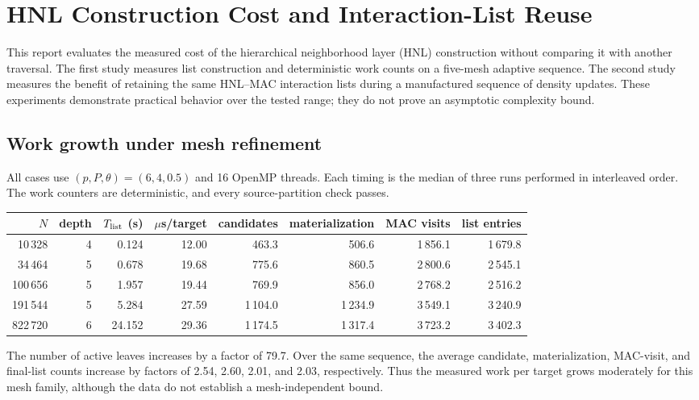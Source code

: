 \documentclass[10pt]{article}
\begin{document}
\section*{HNL Construction Cost and Interaction-List Reuse}

This report evaluates the measured cost of the hierarchical neighborhood
layer (HNL) construction without comparing it with another traversal.  The
first study measures list construction and deterministic work counts on a
five-mesh adaptive sequence.  The second study measures the benefit of
retaining the same HNL--MAC interaction lists during a manufactured sequence
of density updates.  These experiments demonstrate practical behavior over
the tested range; they do not prove an asymptotic complexity bound.

\subsection*{Work growth under mesh refinement}

All cases use $(p,P,\theta)=(6,4,0.5)$ and 16 OpenMP threads.  Each timing is
the median of three runs performed in interleaved order.  The work counters
are deterministic, and every source-partition check passes.

\begin{table}[htbp]
\centering
\small
\setlength{\tabcolsep}{4.5pt}
\begin{tabular}{rrrrrrrr}
\toprule
$N$ & depth & $T_{\rm list}$ (s) & $\mu$s/target & candidates & materialization & MAC visits & list entries \\
\midrule
10\,328  & 4 & 0.124 & 12.00 & 463.3  & 506.6  & 1\,856.1 & 1\,679.8 \\
34\,464  & 5 & 0.678 & 19.68 & 775.6  & 860.5  & 2\,800.6 & 2\,545.1 \\
100\,656 & 5 & 1.957 & 19.44 & 769.9  & 856.0  & 2\,768.2 & 2\,516.2 \\
191\,544 & 5 & 5.284 & 27.59 & 1\,104.0 & 1\,234.9 & 3\,549.1 & 3\,240.9 \\
822\,720 & 6 & 24.152 & 29.36 & 1\,174.5 & 1\,317.4 & 3\,723.2 & 3\,402.3 \\
\bottomrule
\end{tabular}
\end{table}

The number of active leaves increases by a factor of 79.7.  Over the same
sequence, the average candidate, materialization, MAC-visit, and final-list
counts increase by factors of 2.54, 2.60, 2.01, and 2.03, respectively.
Thus the measured work per target grows moderately for this mesh family,
although the data do not establish a mesh-independent bound.
\end{document}
